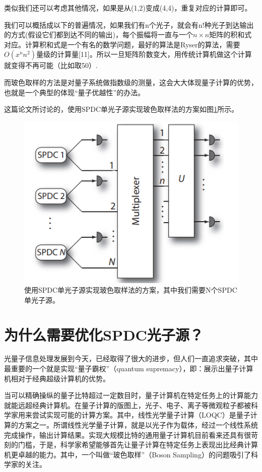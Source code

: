 类似我们还可以考虑其他情况，如果是从(1,2)变成(4,4)，重复对应的计算即可。

我们可以概括成以下的普遍情况，如果我们有n个光子，就会有n!种光子到达输出的方式(假设它们都到达不同的输出)，每个振幅将一直与一个$n\times n$矩阵的积和式对应。计算积和式是一个有名的数学问题，最好的算法是Ryser的算法，需要$O(x^nn^2)$量级的计算量[11]。所以一旦矩阵阶数变大，用传统计算机做这个计算就变得不再可能（比如取50）.

而玻色取样的方法是对量子系统做指数级的测量，这会大大体现量子计算的优势，也就是一个典型的体现“量子优越性”的办法。

这篇论文所讨论的，使用SPDC单光子源实现玻色取样法的方案如图\ref{fig:SPDCBS}所示。

\begin{figure}[ht]
	\centering
	\includegraphics[scale=0.3]{pic/SPDCBS}
	\caption{使用SPDC单光子源实现玻色取样法的方案，其中我们需要N个SPDC单光子源。}
	\label{fig:SPDCBS}
\end{figure}


\section{为什么需要优化SPDC光子源？}
光量子信息处理发展到今天，已经取得了很大的进步，但人们一直追求突破，其中最重要的一个就是实现“量子霸权”（quantum supremacy），即：展示出量子计算机相对于经典超级计算机的优势。

当可以精确操纵的量子比特超过一定数目时，量子计算机在特定任务上的计算能力就能远超经典计算机。在量子计算的版图上，光子、电子、离子等微观粒子都被科学家用来尝试实现可能的计算方案。其中，线性光学量子计算（LOQC）是量子计算的方案之一。所谓线性光学量子计算，就是以光子作为载体，经过一个线性系统完成操作，输出计算结果。实现大规模比特的通用量子计算机目前看来还具有很苛刻的门槛，于是，科学家希望能够首先让量子计算在特定任务上表现出比经典计算机更卓越的能力。其中，一个叫做“玻色取样”（Boson Sampling）的问题吸引了科学家的关注。

